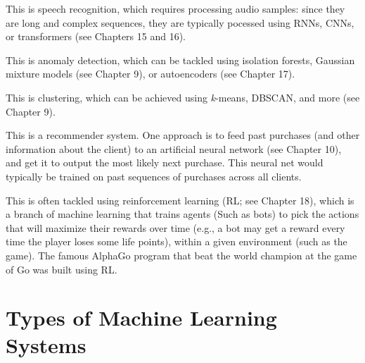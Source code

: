 \begin{nobullet}
\begin{nobullet}
    \end{nobullet}
    \begin{nobullet}
        \item This is speech recognition, which requires processing audio samples: since they are long and complex sequences, they are typically pocessed using RNNs, CNNs, or transformers (see Chapters 15 and 16).
    \end{nobullet}
    \begin{nobullet}
        \item This is anomaly detection, which can be tackled using isolation forests, Gaussian mixture models (see Chapter 9), or autoencoders (see Chapter 17).
    \end{nobullet}
    \begin{nobullet}
        \item This is clustering, which can be achieved using \textit{k}-means, DBSCAN, and more (see Chapter 9).
    \end{nobullet}
    \begin{nobullet}
        \item This is a recommender system. One approach is to feed past purchases (and other information about the client) to an artificial neural network (see Chapter 10), and get it to output the most likely next purchase. This neural net would typically be trained on past sequences of purchases across all clients. 
    \end{nobullet}
    \begin{nobullet}
        \item This is often tackled using reinforcement learning (RL; see Chapter 18), which is a branch of machine learning that trains agents (Such as bots) to pick the actions that will maximize their rewards over time (e.g., a bot may get a reward every time the player loses some life points), within a given environment (such as the game). The famous AlphaGo program that beat the world champion at the game of Go was built using RL.
    \end{nobullet}
\end{nobullet}

\section{Types of Machine Learning Systems}
\label{sec:types_of_ml_systems}


